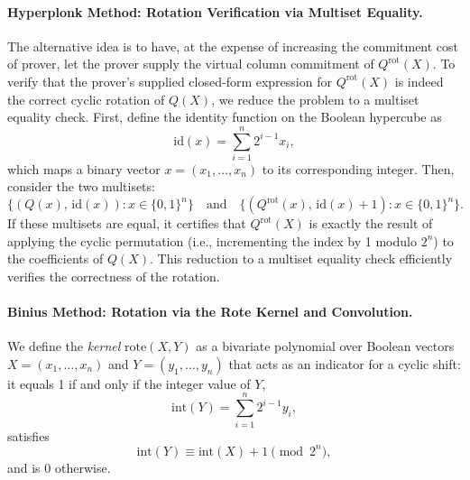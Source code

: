 \documentclass{article}
\begin{document}
\paragraph{Hyperplonk Method: Rotation Verification via Multiset Equality.}  The alternative idea is to have, at the expense of increasing the commitment cost of prover, let the prover supply the virtual column commitment of  \( Q^{\text{rot}}(X) \).
To verify that the prover's supplied closed-form expression for \( Q^{\text{rot}}(X) \) is indeed the correct cyclic rotation of \( Q(X) \), we reduce the problem to a multiset equality check. First, define the identity function on the Boolean hypercube as
\[
\text{id}(x) = \sum_{i=1}^{n} 2^{i-1} x_i,
\]
which maps a binary vector \( x = (x_1,\dots,x_n) \) to its corresponding integer. Then, consider the two multisets:
\[
\{(Q(x),\, \text{id}(x)) : x \in \{0,1\}^n\} \quad \text{and} \quad \{(Q^{\text{rot}}(x),\, \text{id}(x)+1) : x \in \{0,1\}^n\}.
\]
If these multisets are equal, it certifies that \( Q^{\text{rot}}(X) \) is exactly the result of applying the cyclic permutation (i.e., incrementing the index by 1 modulo \(2^n\)) to the coefficients of \( Q(X) \). This reduction to a multiset equality check efficiently verifies the correctness of the rotation.



\paragraph{Binius Method: Rotation via the Rote Kernel and Convolution.}  
We define the\emph{ kernel} \(\text{rote}(X,Y)\) as a bivariate polynomial over Boolean vectors \(X = (x_1,\dots,x_n)\) and \(Y = (y_1,\dots,y_n)\) that acts as an indicator for a cyclic shift: it equals 1 if and only if the integer value of \(Y\),
\[
\text{int}(Y)=\sum_{i=1}^n 2^{i-1} y_i,
\]
satisfies
\[
\text{int}(Y) \equiv \text{int}(X)+1 \pmod{2^n},
\]
and is 0 otherwise.
\end{document}
